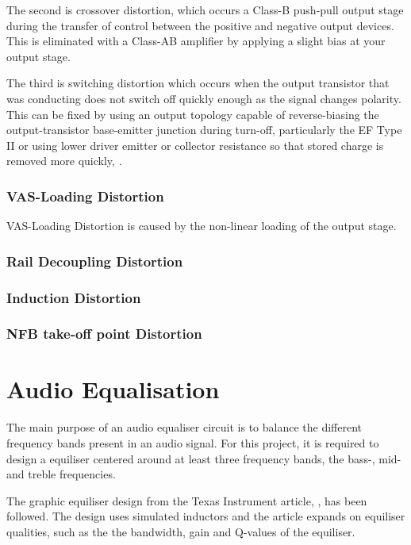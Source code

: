 The second is crossover distortion, which occurs a Class-B push-pull output stage during the transfer of control between the positive and negative output devices. This is eliminated with a Class-AB amplifier by applying a slight bias at your output stage.

The third is switching distortion which occurs when the output transistor that was conducting does not switch off quickly enough as the signal changes polarity. This can be fixed by using an output topology capable of reverse-biasing the output-transistor base-emitter junction during turn-off, particularly the EF Type II or using lower driver emitter or collector resistance so that stored charge is removed more quickly, \cite[p.~185]{Self:2009}.

\subsubsection{VAS-Loading Distortion}

VAS-Loading Distortion is caused by the non-linear loading of the output stage.

\subsubsection{Rail Decoupling Distortion}

\subsubsection{Induction Distortion}

\subsubsection{NFB take-off point Distortion}

\section{Audio Equalisation}

The main purpose of an audio equaliser circuit is to balance the different frequency bands present in an audio signal. For this project, it is required to design a equiliser centered around at least three frequency bands, the bass-, mid- and treble frequencies.

The graphic equiliser design from the Texas Instrument article, \cite{Carter:2001}, has been followed. The design uses simulated inductors and the article expands on equiliser qualities, such as the the bandwidth, gain and Q-values of the equiliser. 

